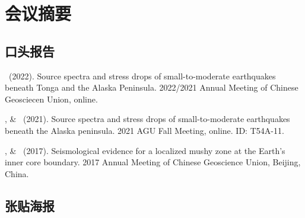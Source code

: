 \section{会议摘要}

\subsection{口头报告}

\begin{etaremune}
\item
	\Me\ (2022).
	Source spectra and stress drops of small-to-moderate earthquakes beneath Tonga and the Alaska Peninsula.
	2022/2021 Annual Meeting of Chinese Geosciecen Union, online.
\item
	\Me, \& \SWei\ (2021).
    Source spectra and stress drops of small-to-moderate earthquakes beneath the Alaska peninsula.
    2021 AGU Fall Meeting, online. ID: T54A-11.
\item
    \Me, \& \LWen\ (2017).
    Seismological evidence for a localized mushy zone at the Earth's inner core boundary.
    2017 Annual Meeting of Chinese Geoscience Union, Beijing, China.
\end{etaremune}

\subsection{张贴海报}

